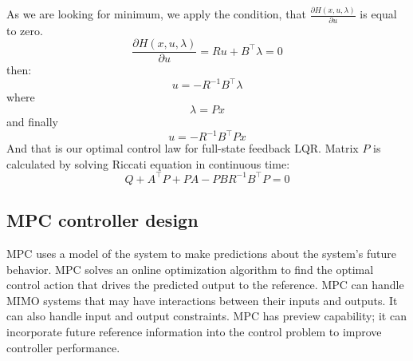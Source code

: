 As we are looking for minimum, we apply the condition, that $\frac{\partial H(x,u,\lambda)}{\partial u}$ is equal to zero.
\begin{equation}
	\frac{\partial H(x,u,\lambda)}{\partial u} = Ru + B^\intercal\lambda = 0
\end{equation}
then:
\begin{equation}
u = -R^{-1}B^\intercal\lambda
\end{equation}
where
\begin{equation}
\lambda = Px
\end{equation}
and finally
\begin{equation}
u = -R^{-1}B^\intercal Px
\end{equation}
And that is our optimal control law for full-state feedback LQR. Matrix $P$ is calculated by solving Riccati equation in continuous time:
\begin{equation}
Q + A^\intercal P + PA - PBR^{-1}B^\intercal P = 0
\end{equation}
\subsection{MPC controller design}
MPC uses a model of the system to make predictions about the system’s future behavior. MPC solves an online optimization algorithm to find the optimal control action that drives the predicted output to the reference. MPC can handle MIMO systems that may have interactions between their inputs and outputs. It can also handle input and output constraints. MPC has preview capability; it can incorporate future reference information into the control problem to improve controller performance.
